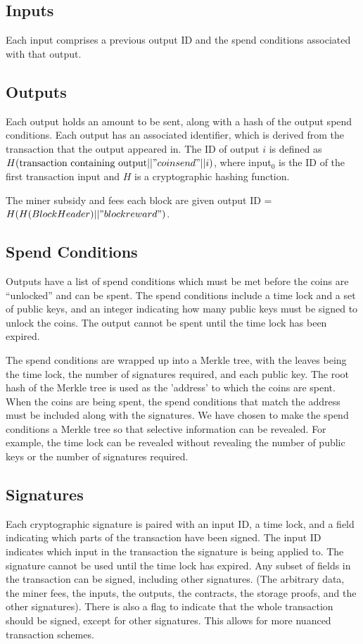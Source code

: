 \documentclass[twocolumn]{article}
\begin{document}
\subsection{Inputs}
Each input comprises a previous output ID and the spend conditions associated with that output.

\subsection{Outputs}
Each output holds an amount to be sent, along with a hash of the output spend conditions.
Each output has an associated identifier, which is derived from the transaction that the output appeared in.
The ID of output $i$ is defined as $H(\text{transaction containing output} || "coinsend" || i)$,
where input$_0$ is the ID of the first transaction input and $H$ is a cryptographic hashing function.

The miner subsidy and fees each block are given output ID = $H(H(Block Header) || "blockreward")$.

\subsection{Spend Conditions}
Outputs have a list of spend conditions which must be met before the coins are ``unlocked'' and can be spent.
The spend conditions include a time lock and a set of public keys, and an integer indicating how many public keys must be signed to unlock the coins.
The output cannot be spent until the time lock has been expired.

The spend conditions are wrapped up into a Merkle tree, with the leaves being the time lock, the number of signatures required, and each public key.
The root hash of the Merkle tree is used as the 'address' to which the coins are spent.
When the coins are being spent, the spend conditions that match the address must be included along with the signatures.
We have chosen to make the spend conditions a Merkle tree so that selective information can be revealed.
For example, the time lock can be revealed without revealing the number of public keys or the number of signatures required.

\subsection{Signatures}
Each cryptographic signature is paired with an input ID, a time lock, and a field indicating which parts of the transaction have been signed.
The input ID indicates which input in the transaction the signature is being applied to.
The signature cannot be used until the time lock has expired.
Any subset of fields in the transaction can be signed, including other signatures. (The arbitrary data, the miner fees, the inputs, the outputs, the contracts, the storage proofs, and the other signatures).
There is also a flag to indicate that the whole transaction should be signed, except for other signatures.
This allows for more nuanced transaction schemes.
\end{document}
